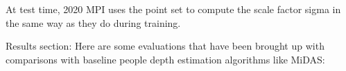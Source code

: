 At test time, 2020 MPI uses the point set to compute the scale factor sigma in the same way as they do during training.

Results section:
Here are some evaluations that have been brought up with comparisons with baseline people depth estimation algorithms like MiDAS:


    
  
    
    
    

    
    
    
    
    
    
